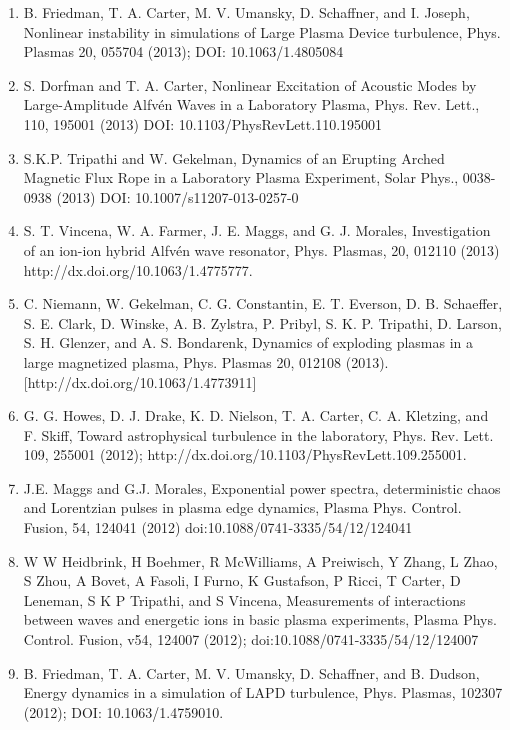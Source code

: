 \documentclass[11pt]{article}
\begin{document}
\begin{enumerate}
\item   B. Friedman, T. A. Carter, M. V. Umansky, D. Schaffner, and I. Joseph, Nonlinear instability in simulations of Large Plasma Device turbulence, Phys. Plasmas 20, 055704 (2013); DOI: 10.1063/1.4805084

\item  S. Dorfman and T. A. Carter, Nonlinear Excitation of Acoustic Modes by Large-Amplitude Alfv\'{e}n Waves in a Laboratory Plasma, Phys. Rev. Lett., 110, 195001 (2013) DOI: 10.1103/PhysRevLett.110.195001

\item  S.K.P. Tripathi and W. Gekelman, Dynamics of an Erupting Arched Magnetic Flux Rope in a Laboratory Plasma Experiment, Solar Phys., 0038-0938 (2013) DOI: 10.1007/s11207-013-0257-0

\item   S. T. Vincena, W. A. Farmer, J. E. Maggs, and G. J. Morales, Investigation of an ion-ion hybrid Alfv\'{e}n wave resonator, Phys. Plasmas, 20, 012110 (2013) http://dx.doi.org/10.1063/1.4775777.

\item   C. Niemann, W. Gekelman, C. G. Constantin, E. T. Everson, D. B. Schaeffer, S. E. Clark, D. Winske, A. B. Zylstra, P. Pribyl, S. K. P. Tripathi, D. Larson, S. H. Glenzer, and A. S. Bondarenk, Dynamics of exploding plasmas in a large magnetized plasma, Phys. Plasmas 20, 012108 (2013). [http://dx.doi.org/10.1063/1.4773911]

\item   G. G. Howes, D. J. Drake, K. D. Nielson, T. A. Carter, C. A. Kletzing, and F. Skiff, Toward astrophysical turbulence in the laboratory, Phys. Rev. Lett. 109, 255001 (2012); http://dx.doi.org/10.1103/PhysRevLett.109.255001.

\item   J.E. Maggs and G.J. Morales, Exponential power spectra, deterministic chaos and Lorentzian pulses in plasma edge dynamics, Plasma Phys. Control. Fusion, 54, 124041 (2012) doi:10.1088/0741-3335/54/12/124041

\item W W Heidbrink, H Boehmer, R McWilliams, A Preiwisch, Y Zhang, L Zhao, S Zhou, A Bovet, A Fasoli, I Furno, K Gustafson, P Ricci, T Carter, D Leneman, S K P Tripathi, and S Vincena, Measurements of interactions between waves and energetic ions in basic plasma experiments, Plasma Phys. Control. Fusion, v54, 124007 (2012); doi:10.1088/0741-3335/54/12/124007

\item  B. Friedman, T. A. Carter, M. V. Umansky, D. Schaffner, and B. Dudson, Energy dynamics in a simulation of LAPD turbulence, Phys. Plasmas, 102307 (2012); DOI: 10.1063/1.4759010.


\end{enumerate}
\end{document}
